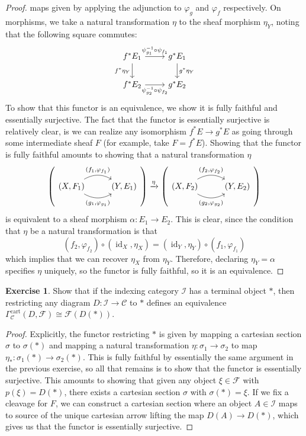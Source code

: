 \documentclass[psamsfonts, 12pt]{amsart}
\theoremstyle{definition}
\newtheorem{exer}[thm]{Exercise}
\theoremstyle{remark}
\newcommand{\inv}{^{-1}}
\DeclareMathOperator{\id}{id}
\begin{document}
\begin{proof}
maps given by applying the adjunction to $\varphi_g$ and $\varphi_f$ respectively. On
morphisms, we take a natural transformation $\eta$ to the sheaf morphism $\eta_Y$,
noting that the following square commutes:
\[\begin{tikzcd}
f^*E_1 \ar[r, "\psi_{g_1}\inv \circ \psi_{f_1}"]
\ar[d, "f^*\eta_Y"'] & g^*E_1 \ar[d, "g^*\eta_Y"] \\
f^*E_2 \ar[r, "\psi_{g_2}\inv \circ \psi_{f_2}"'] & g^*E_2
\end{tikzcd}\]
To show that this functor is an equivalence, we show it is fully faithful and
essentially surjective. The fact that the functor is essentially surjective is
relatively clear, is we can realize any isomorphism $f^*E\to g^*E$ as going
through some intermediate sheaf $F$ (for example, take $F = f^*E$). Showing that
the functor is fully faithful amounts to showing that a natural transformation $\eta$
\[
\left(\begin{tikzcd}
(X,F_1) \ar[r, "{(f_1,\varphi_{f_1})}", bend left=30]
\ar[r, "{(g_1,\varphi_{g_1})}"', bend right=30]
& (Y,E_1)
\end{tikzcd}\right) \xrightarrow{\eta}
\left( \begin{tikzcd}
(X,F_2) \ar[r, "{(f_2,\varphi_{f_2})}", bend left=30]
\ar[r, "{(g_2,\varphi_{g_2})}"', bend right=30]
& (Y,E_2)
\end{tikzcd}\right)
\]
is equivalent to a sheaf morphism $\alpha : E_1 \to E_2$. This
is clear, since the condition that $\eta$ be a natural transformation is that
\[
(f_2,\varphi_{f_2}) \circ (\id_X,\eta_X) = (\id_Y,\eta_Y) \circ (f_1, \varphi_{f_1})
\]
which implies that we can recover $\eta_X$ from $\eta_Y$. Therefore, declaring
$\eta_Y = \alpha$ specifies $\eta$ uniquely, so the functor is fully faithful,
so it is an equivalence.
\end{proof}
%
\begin{exer}
Show that if the indexing category $\mathcal{I}$ has a terminal object $*$, then
restricting any diagram $D : \mathcal{I} \to \mathcal{C}$ to $*$ defines an equivalence
$\Gamma^{\mathrm{cart}}_{\mathcal{C}}(D,\mathcal{F}) \cong \mathcal{F}(D(*))$.
\end{exer}
%
\begin{proof}
Explicitly, the functor restricting $*$ is given by mapping a cartesian
section $\sigma$ to $\sigma(*)$ and mapping a natural transformation
$\eta : \sigma_1 \to \sigma_2$ to map $\eta_* : \sigma_1(*) \to \sigma_2(*)$. This
is fully faithful by essentially the same argument in the previous exercise, so all
that remains is to show that the functor is essentially surjective. This amounts
to showing that given any object $\xi \in \mathcal{F}$ with $p(\xi) = D(*)$,
there exists a cartesian section $\sigma$ with $\sigma(*) = \xi$. If we fix a
cleavage for $F$, we can construct a cartesian section where an object
$A \in \mathcal{I} $ maps to source of the unique cartesian arrow lifting the map
$D(A) \to D(*)$, which gives us that the functor is essentially surjective.
\end{proof}
\end{document}
